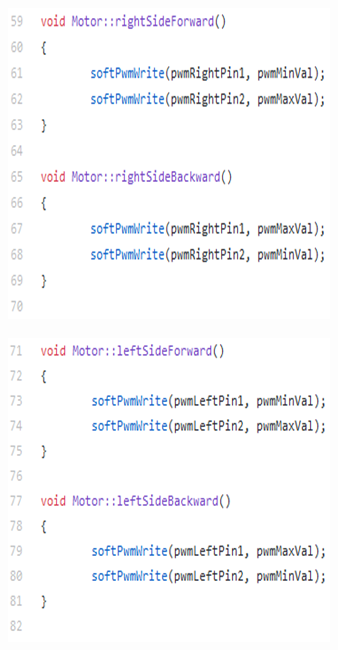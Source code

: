 \begin{figure}[h]
\centering
\begin{minipage}{.5\textwidth}
  \centering
  \includegraphics[width=1\linewidth]{figures/63.png}
  \label{fig:test1}
\end{minipage}%
\begin{minipage}{.5\textwidth}
  \centering
  \includegraphics[width=1\linewidth]{figures/64.png}
  \label{fig:test2}
\end{minipage}
\end{figure}


